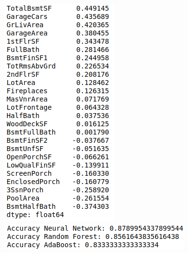 \begin{figure}%
\begin{center}
\begin{minipage}{.5\textwidth}
  \centering
  \includegraphics[width=0.7\linewidth]{imgs/r2_score.png}
\end{minipage}%
\begin{minipage}{.5\textwidth}
  \centering
  \includegraphics[width=0.7\linewidth]{imgs/accuracy_models.png}
\end{minipage}
\end{center}
\hrulefill\vspace{15pt}\par
\end{figure}


